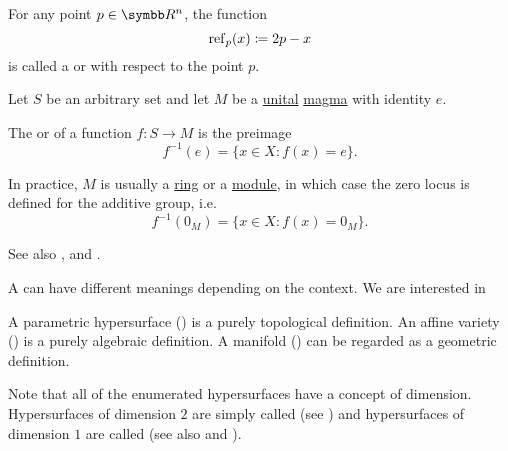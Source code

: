 \begin{definition}
\begin{DefEnum}
     For any point \( p \in \BR^n \), the function
    \begin{equation*}
      \operatorname{ref}_p(x) \coloneqq 2p - x
    \end{equation*}
    is called a  or  with respect to the point \( p \).
  \end{DefEnum}
\end{definition}

\begin{definition}\label{def:zero_locus}
  Let \( S \) be an arbitrary set and let \( M \) be a \hyperref[def:algebraic_theory/identity]{unital} \hyperref[def:magma/magma]{magma} with identity \( e \).

  The  or  of a function \( f: S \to M \) is the preimage
  \begin{equation*}
    f^{-1}(e) = \{ x \in X \colon f(x) = e \}.
  \end{equation*}

  In practice, \( M \) is usually a \hyperref[def:semiring/ring]{ring} or a \hyperref[def:left_module]{module}, in which case the zero locus is defined for the additive group, i.e.
  \begin{equation*}
    f^{-1}(0_M) = \{ x \in X \colon f(x) = 0_M \}.
  \end{equation*}

  See also ,  and .
\end{definition}

\begin{definition}\label{def:hypersurface}
  A  can have different meanings depending on the context. We are interested in

  \begin{DefEnum}
     A parametric hypersurface () is a purely topological definition.
     An affine variety () is a purely algebraic definition.
     A manifold () can be regarded as a geometric definition.
  \end{DefEnum}

  Note that all of the enumerated hypersurfaces have a concept of dimension. Hypersurfaces of dimension \( 2 \) are simply called  (see ) and hypersurfaces of dimension \( 1 \) are called  (see also  and ).
\end{definition}

